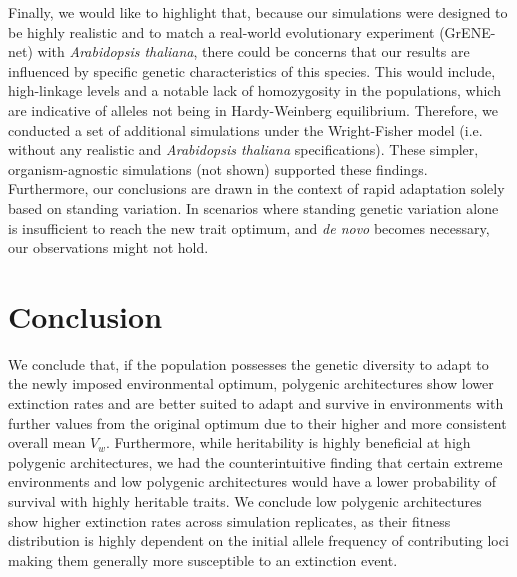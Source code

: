 \documentclass{article}
\begin{document}
Finally, we would like to highlight that, because our simulations were designed to be highly realistic and to match a real-world evolutionary experiment (GrENE-net) with \textit{Arabidopsis thaliana}, there could be concerns that our results are influenced by specific genetic characteristics of this species. This would include, high-linkage levels and a notable lack of homozygosity in the populations, which are indicative of alleles not being in Hardy-Weinberg equilibrium. Therefore, we conducted a set of additional simulations under the Wright-Fisher model (i.e. without any realistic and \textit{Arabidopsis thaliana} specifications). These simpler, organism-agnostic simulations (not shown) supported these findings. Furthermore, our conclusions are drawn in the context of rapid adaptation solely based on standing variation. In scenarios where standing genetic variation alone is insufficient to reach the new trait optimum, and \textit{de novo} becomes necessary, our observations might not hold. 

\section{Conclusion}
We conclude that, if the population possesses the genetic diversity to adapt to the newly imposed environmental optimum, polygenic architectures show lower extinction rates and are better suited to adapt and survive in environments with further values from the original optimum due to their higher and more consistent overall mean $V_w$. Furthermore, while heritability is highly beneficial at high polygenic architectures, we had the counterintuitive finding that certain extreme environments and low polygenic architectures would have a lower probability of survival with highly heritable traits. We conclude low polygenic architectures show higher extinction rates across simulation replicates, as their fitness distribution is highly dependent on the initial allele frequency of contributing loci making them generally more susceptible to an extinction event. 


\end{document}
